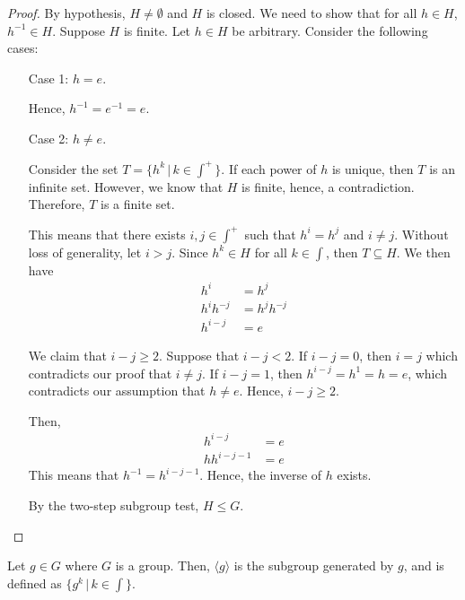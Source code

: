     \begin{proof}
        By hypothesis, \(H \neq \emptyset\) and \(H\) is closed. We need to show that for all \(h\in H\), \(h^{-1} \in H\). Suppose \(H\) is finite. Let \(h\in H\) be arbitrary. Consider the following cases:
        \begin{enumerate}
            \item[Case 1:]\(h = e\).

            Hence, \(h^{-1} = e^{-1} = e\).

            \item[Case 2:]\(h \neq e\).

            Consider the set \(T = \{h^k \,|\, k\in\int^+\}\). If each power of \(h\) is unique, then \(T\) is an infinite set. However, we know that \(H\) is finite, hence, a contradiction. Therefore, \(T\) is a finite set.

            This means that there exists \(i, j\in \int^+\) such that \(h^i = h^j\) and \(i \neq j\). Without loss of generality, let \(i > j\). Since \(h^k \in H\) for all \(k\in\int\), then \(T \subseteq H\). We then have
            \begin{align*}
                h^i &= h^j \\
                h^i h^{-j} &= h^j h^{-j} \\
                h^{i-j} &= e
            \end{align*}

            We claim that \(i - j \geq 2\). Suppose that \(i - j < 2\). If \(i - j = 0\), then \(i = j\) which contradicts our proof that \(i \neq j\). If \(i - j = 1\), then \(h^{i - j} = h^1 = h = e\), which contradicts our assumption that \(h \neq e\). Hence, \(i - j \geq 2\).

            Then,
            \begin{align*}
                h^{i - j} &= e \\
                hh^{i - j - 1} &= e
            \end{align*}
            This means that \(h^{-1} = h^{i - j - 1}\). Hence, the inverse of \(h\) exists.

            By the two-step subgroup test, \(H \leq G\).
        \end{enumerate}
    \end{proof}


    \begin{dfn}
        Let \(g\in G\) where \(G\) is a group. Then, \(\langle g \rangle\) is the subgroup generated by \(g\), and is defined as \(\{g^k \,|\, k\in\int\}\).
    \end{dfn}

